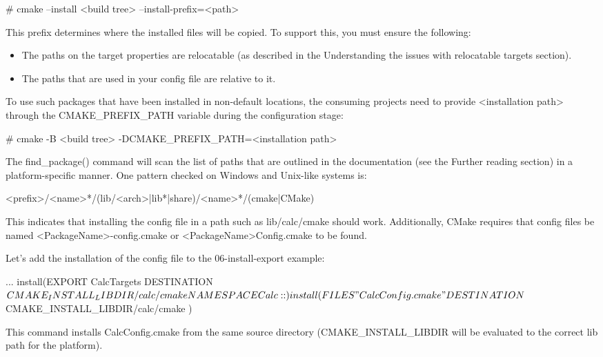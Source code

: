 \begin{shell}
# cmake --install <build tree> --install-prefix=<path>
\end{shell}

This prefix determines where the installed files will be copied. To support this, you must ensure the following:

\begin{itemize}
\item
The paths on the target properties are relocatable (as described in the Understanding the issues with relocatable targets section).

\item
The paths that are used in your config file are relative to it.
\end{itemize}

To use such packages that have been installed in non-default locations, the consuming projects need to provide <installation path> through the CMAKE\_PREFIX\_PATH variable during the configuration stage:

\begin{shell}
# cmake -B <build tree> -DCMAKE_PREFIX_PATH=<installation path>
\end{shell}

The find\_package() command will scan the list of paths that are outlined in the documentation (see the Further reading section) in a platform-specific manner. One pattern checked on Windows and Unix-like systems is:

\begin{shell}
<prefix>/<name>*/(lib/<arch>|lib*|share)/<name>*/(cmake|CMake)
\end{shell}

This indicates that installing the config file in a path such as lib/calc/cmake should work. Additionally, CMake requires that config files be named <PackageName>-config.cmake or <PackageName>Config.cmake to be found.

Let’s add the installation of the config file to the 06-install-export example:


\begin{cmake}
...
install(EXPORT CalcTargets
    DESTINATION ${CMAKE_INSTALL_LIBDIR}/calc/cmake
    NAMESPACE Calc::
)
install(FILES "CalcConfig.cmake"
    DESTINATION ${CMAKE_INSTALL_LIBDIR}/calc/cmake
)
\end{cmake}

This command installs CalcConfig.cmake from the same source directory (CMAKE\_INSTALL\_LIBDIR will be evaluated to the correct lib path for the platform).

